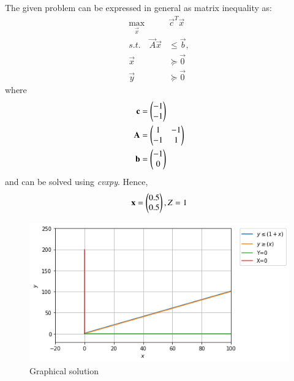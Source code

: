 \documentclass[journal,12pt,twocolumn]{IEEEtran}
\begin{document}
The given problem can be expressed in general as matrix inequality as:
\begin{align}
\max_{\vec{x}} &\vec{c}^{T}\vec{x}
\\
s.t. \quad \vec{A}\vec{x} &\le \vec{b},
\\
\vec{x} &\succeq\vec{0}\\
\vec{y} &\succeq \vec{0}
\end{align}
%
where
\begin{align}
\vec{c} &= \myvec{-1 \\ -1}
\\
\vec{A} &=
\myvec{
1 & -1
\\
-1 & 1
}
\\
\vec{b}&=\myvec{-1\\0}
%
\end{align}
%
and can be solved using {\em cvxpy}. 
Hence,
\begin{align}
\mathbf{x} = \begin{pmatrix}0.5\\0.5\end{pmatrix}, Z = 1
\end{align}


\begin{figure}[ht]
    \centering
    \includegraphics[width=\columnwidth]{download.png}
    \caption{Graphical solution}
    \label{Graphical solution}
\end{figure}
\end{document}
